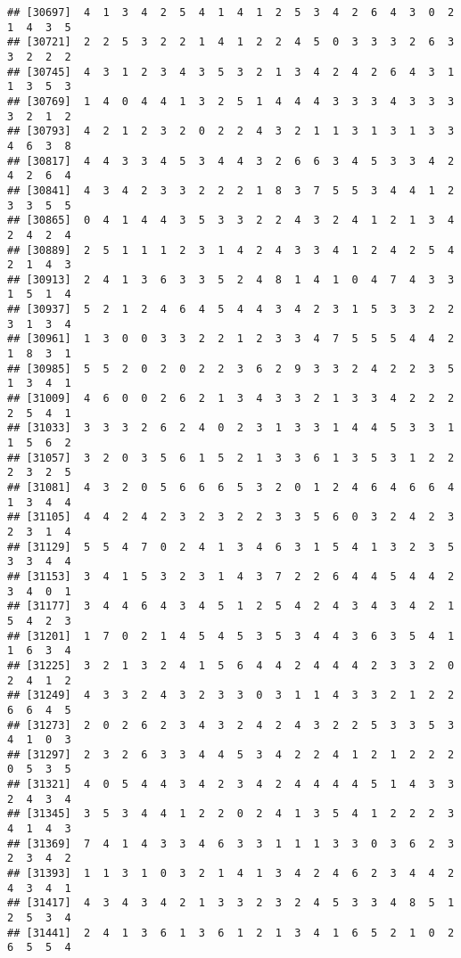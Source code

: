 \documentclass[
]{article}
\begin{document}
\begin{verbatim}
## [30697]  4  1  3  4  2  5  4  1  4  1  2  5  3  4  2  6  4  3  0  2  1  4  3  5
## [30721]  2  2  5  3  2  2  1  4  1  2  2  4  5  0  3  3  3  2  6  3  3  2  2  2
## [30745]  4  3  1  2  3  4  3  5  3  2  1  3  4  2  4  2  6  4  3  1  1  3  5  3
## [30769]  1  4  0  4  4  1  3  2  5  1  4  4  4  3  3  3  4  3  3  3  3  2  1  2
## [30793]  4  2  1  2  3  2  0  2  2  4  3  2  1  1  3  1  3  1  3  3  4  6  3  8
## [30817]  4  4  3  3  4  5  3  4  4  3  2  6  6  3  4  5  3  3  4  2  4  2  6  4
## [30841]  4  3  4  2  3  3  2  2  2  1  8  3  7  5  5  3  4  4  1  2  3  3  5  5
## [30865]  0  4  1  4  4  3  5  3  3  2  2  4  3  2  4  1  2  1  3  4  2  4  2  4
## [30889]  2  5  1  1  1  2  3  1  4  2  4  3  3  4  1  2  4  2  5  4  2  1  4  3
## [30913]  2  4  1  3  6  3  3  5  2  4  8  1  4  1  0  4  7  4  3  3  1  5  1  4
## [30937]  5  2  1  2  4  6  4  5  4  4  3  4  2  3  1  5  3  3  2  2  3  1  3  4
## [30961]  1  3  0  0  3  3  2  2  1  2  3  3  4  7  5  5  5  4  4  2  1  8  3  1
## [30985]  5  5  2  0  2  0  2  2  3  6  2  9  3  3  2  4  2  2  3  5  1  3  4  1
## [31009]  4  6  0  0  2  6  2  1  3  4  3  3  2  1  3  3  4  2  2  2  2  5  4  1
## [31033]  3  3  3  2  6  2  4  0  2  3  1  3  3  1  4  4  5  3  3  1  1  5  6  2
## [31057]  3  2  0  3  5  6  1  5  2  1  3  3  6  1  3  5  3  1  2  2  2  3  2  5
## [31081]  4  3  2  0  5  6  6  6  5  3  2  0  1  2  4  6  4  6  6  4  1  3  4  4
## [31105]  4  4  2  4  2  3  2  3  2  2  3  3  5  6  0  3  2  4  2  3  2  3  1  4
## [31129]  5  5  4  7  0  2  4  1  3  4  6  3  1  5  4  1  3  2  3  5  3  3  4  4
## [31153]  3  4  1  5  3  2  3  1  4  3  7  2  2  6  4  4  5  4  4  2  3  4  0  1
## [31177]  3  4  4  6  4  3  4  5  1  2  5  4  2  4  3  4  3  4  2  1  5  4  2  3
## [31201]  1  7  0  2  1  4  5  4  5  3  5  3  4  4  3  6  3  5  4  1  1  6  3  4
## [31225]  3  2  1  3  2  4  1  5  6  4  4  2  4  4  4  2  3  3  2  0  2  4  1  2
## [31249]  4  3  3  2  4  3  2  3  3  0  3  1  1  4  3  3  2  1  2  2  6  6  4  5
## [31273]  2  0  2  6  2  3  4  3  2  4  2  4  3  2  2  5  3  3  5  3  4  1  0  3
## [31297]  2  3  2  6  3  3  4  4  5  3  4  2  2  4  1  2  1  2  2  2  0  5  3  5
## [31321]  4  0  5  4  4  3  4  2  3  4  2  4  4  4  4  5  1  4  3  3  2  4  3  4
## [31345]  3  5  3  4  4  1  2  2  0  2  4  1  3  5  4  1  2  2  2  3  4  1  4  3
## [31369]  7  4  1  4  3  3  4  6  3  3  1  1  1  3  3  0  3  6  2  3  2  3  4  2
## [31393]  1  1  3  1  0  3  2  1  4  1  3  4  2  4  6  2  3  4  4  2  4  3  4  1
## [31417]  4  3  4  3  4  2  1  3  3  2  3  2  4  5  3  3  4  8  5  1  2  5  3  4
## [31441]  2  4  1  3  6  1  3  6  1  2  1  3  4  1  6  5  2  1  0  2  6  5  5  4

\end{verbatim}
\end{document}
